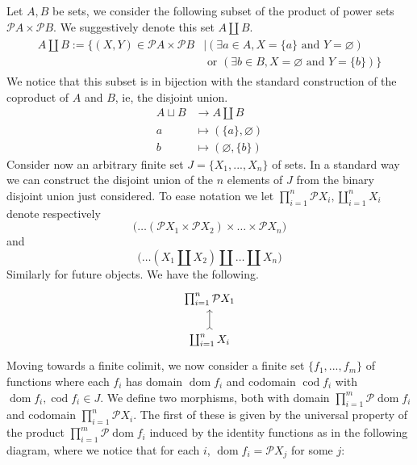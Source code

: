 \documentclass{birkjour}
\theoremstyle{plain}
\theoremstyle{definition}
\newcommand{\call}[1]{\mathcal{#1}}
\newcommand{\lto}{\longrightarrow}
\begin{document}
	Let $A,B$ be sets, we consider the following subset of the product of power sets $\call{P}A \times \call{P}B$. We suggestively denote this set $A \coprod B$.
	\begin{align}
		\begin{split}
			\label{eq:bin_disjoint_union}A \coprod B := \big\lbrace (X,Y) \in \call{P}A \times \call{P}B &\mid (\exists a \in A, X = \lbrace a \rbrace \text{ and }Y = \varnothing)\\
			&\text{ or } (\exists b \in B, X = \varnothing \text{ and }Y = \lbrace b \rbrace )\big\rbrace
		\end{split}
	\end{align}
	We notice that this subset is in bijection with the standard construction of the coproduct of $A$ and $B$, ie, the disjoint union.
	\begin{align*}
		A \sqcup B &\lto A \coprod B\\
		a &\longmapsto (\lbrace a \rbrace, \varnothing)\\
		b &\longmapsto (\varnothing, \lbrace b \rbrace)
	\end{align*}
	Consider now an arbitrary finite set $J = \lbrace X_1,...,X_n\rbrace$ of sets. In a standard way we can construct the disjoint union of the $n$ elements of $J$ from the binary disjoint union just considered. To ease notation we let $\prod_{i = 1}^n\call{P}X_i, \coprod_{i = 1}^n X_i$ denote respectively 
	\begin{equation*}
		\big(\hdots (\call{P}X_1 \times \call{P}X_2)\times \hdots \times\call{P}X_n\big)
	\end{equation*}
	and
	\begin{equation*}
		\big(\hdots (X_1 \coprod X_2) \coprod \hdots \coprod X_n\big)
	\end{equation*}
	Similarly for future objects. We have the following.
	\begin{equation}
		\begin{tikzcd}
			\prod_{i=1}^n \call{P}X_1\\
			\coprod_{i = 1}^n X_i\arrow[u,rightarrowtail]
		\end{tikzcd}
	\end{equation}
	Moving towards a finite colimit, we now consider a finite set $\lbrace f_1,...,f_m\rbrace$ of functions where each $f_i$ has domain $\operatorname{dom}f_i$ and codomain $\operatorname{cod}f_i$ with $\operatorname{dom}f_i, \operatorname{cod}f_i \in J$. We define two morphisms, both with domain $\prod_{i = 1}^m \call{P}\operatorname{dom}f_i$ and codomain $\prod_{i = 1}^n \call{P}X_i$. The first of these is given by the universal property of the product $\prod_{i = 1}^m\call{P} \operatorname{dom}f_i$ induced by the identity functions as in the following diagram, where we notice that for each $i$, $\operatorname{dom}f_i = \call{P}X_j$ for some $j$:
\end{document}
